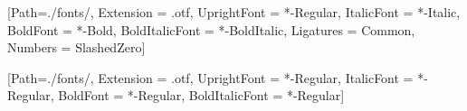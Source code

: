 [Path=./fonts/,
  Extension      = .otf,
  UprightFont    = *-Regular,
  ItalicFont     = *-Italic,
  BoldFont       = *-Bold,
  BoldItalicFont = *-BoldItalic,
  Ligatures       = Common,
  Numbers         = SlashedZero]

[Path=./fonts/,
  Extension      = .otf,
  UprightFont    = *-Regular,
  ItalicFont     = *-Regular,
  BoldFont       = *-Regular,
  BoldItalicFont = *-Regular]
